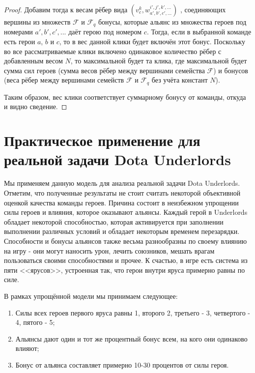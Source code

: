 \documentclass{article}
\begin{document}
\begin{proof}
Добавим тогда к весам рёбер вида  $(v_c^{k}, w_{a',b',c',...}^{i',j',k',...} )$ , соединяющих вершины из множеств 
$\mathcal{F}$ и $\mathcal{F}_q$ бонусы, которые альянс из множества героев под номерами $a', b', c',...$ даёт герою под номером $c$. Тогда, если в выбранной команде есть герои $a$, $b$ и $c$, то в вес данной клики будет включён этот бонус. Поскольку во все рассматриваемые клики включено одинаковое количество рёбер с добавленным весом $N$, то максимальной будет та клика, где максимальной будет сумма сил героев (сумма весов рёбер между вершинами семейства $\mathcal{F}$) и бонусов (веса рёбер между вершинами семейств $\mathcal{F}$ и $\mathcal{F}_q$ без учёта констант $N$).
    
Таким образом, вес клики соответствует суммарному бонусу от команды, откуда и видно сведение.
    
\end{proof}




\section{Практическое применение для реальной задачи Dota Underlords}
\label{SectionComputationalResults}
  
Мы применяем данную модель для анализа реальной задачи Dota Underlords. Отметим, что полученные результаты не стоит считать некоторой объективной оценкой качества команды героев. Причина состоит в неизбежном упрощении силы героев и влияния, которое оказывают альянсы. Каждый герой в Underlords обладает некоторой способностью, которая активируется при заполнении выполнении различных условий и обладает некоторым временем перезарядки. Способности и бонусы альянсов также весьма разнообразны по своему влиянию на игру - они могут наносить урон, лечить союзников, мешать врагам пользоваться своими способностями и прочее. К счастью, в игре есть система из пяти <<ярусов>>, устроенная так, что герои внутри яруса примерно равны по силе.

В рамках упрощённой модели мы принимаем следующее:
\begin{enumerate}
\item Силы всех героев первого яруса равны 1, второго 2, третьего - 3, четвертого - 4, пятого - 5;
\item Альянсы дают один и тот же процентный бонус всем, на кого они одинаково влияют;
\item Бонус от альянса составляет примерно 10-30 процентов от силы героя.
\end{enumerate}
\end{document}
